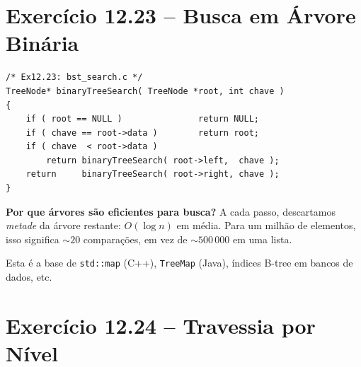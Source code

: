 \documentclass[12pt,a4paper]{article}
\begin{document}
\section{Exercício 12.23 -- Busca em Árvore Binária}

\begin{respostabox}
\begin{lstlisting}
/* Ex12.23: bst_search.c */
TreeNode* binaryTreeSearch( TreeNode *root, int chave )
{
    if ( root == NULL )               return NULL;
    if ( chave == root->data )        return root;
    if ( chave  < root->data )
        return binaryTreeSearch( root->left,  chave );
    return     binaryTreeSearch( root->right, chave );
}
\end{lstlisting}

\textbf{Por que árvores são eficientes para busca?} A cada passo, descartamos
\textit{metade} da árvore restante: $O(\log n)$ em média. Para um milhão de
elementos, isso significa $\sim 20$ comparações, em vez de $\sim 500\,000$ em
uma lista.

Esta é a base de \texttt{std::map} (C++), \texttt{TreeMap} (Java), índices
B-tree em bancos de dados, etc.
\end{respostabox}

\section{Exercício 12.24 -- Travessia por Nível}
\end{document}
